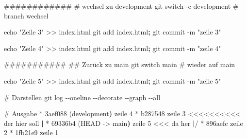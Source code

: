 \documentclass[
  ngerman,
  letterpaper,
  DIV=11]{scrreprt}
\newenvironment{Shaded}{\begin{snugshade}}{\end{snugshade}}
\newcommand{\AttributeTok}[1]{\textcolor[rgb]{0.40,0.45,0.13}{#1}}
\newcommand{\BuiltInTok}[1]{\textcolor[rgb]{0.00,0.23,0.31}{#1}}
\newcommand{\CommentTok}[1]{\textcolor[rgb]{0.37,0.37,0.37}{#1}}
\newcommand{\ErrorTok}[1]{\textcolor[rgb]{0.68,0.00,0.00}{#1}}
\newcommand{\ExtensionTok}[1]{\textcolor[rgb]{0.00,0.23,0.31}{#1}}
\newcommand{\FunctionTok}[1]{\textcolor[rgb]{0.28,0.35,0.67}{#1}}
\newcommand{\KeywordTok}[1]{\textcolor[rgb]{0.00,0.23,0.31}{\textbf{#1}}}
\newcommand{\NormalTok}[1]{\textcolor[rgb]{0.00,0.23,0.31}{#1}}
\newcommand{\OperatorTok}[1]{\textcolor[rgb]{0.37,0.37,0.37}{#1}}
\newcommand{\StringTok}[1]{\textcolor[rgb]{0.13,0.47,0.30}{#1}}
\begin{document}
\begin{Shaded}
\begin{Highlighting}[]
\CommentTok{\#\#\#\#\#\#\#\#\#\#\#\#}
\CommentTok{\# wechsel zu development}
\FunctionTok{git}\NormalTok{ switch }\AttributeTok{{-}c}\NormalTok{ development  }\CommentTok{\# branch wechsel}

\BuiltInTok{echo} \StringTok{"Zeile 3"} \OperatorTok{\textgreater{}\textgreater{}}\NormalTok{ index.html}
\FunctionTok{git}\NormalTok{ add index.html}\KeywordTok{;} \FunctionTok{git}\NormalTok{ commit }\AttributeTok{{-}m} \StringTok{"zeile 3"}

\BuiltInTok{echo} \StringTok{"Zeile 4"} \OperatorTok{\textgreater{}\textgreater{}}\NormalTok{ index.html}
\FunctionTok{git}\NormalTok{ add index.html}\KeywordTok{;} \FunctionTok{git}\NormalTok{ commit }\AttributeTok{{-}m} \StringTok{"zeile 4"}

\CommentTok{\#\#\#\#\#\#\#\#\#\#\#}
\CommentTok{\#\# Zurück zu main}
\FunctionTok{git}\NormalTok{ switch main  }\CommentTok{\# wieder auf main}

\BuiltInTok{echo} \StringTok{"Zeile 5"} \OperatorTok{\textgreater{}\textgreater{}}\NormalTok{ index.html}
\FunctionTok{git}\NormalTok{ add index.html}\KeywordTok{;} \FunctionTok{git}\NormalTok{ commit }\AttributeTok{{-}m} \StringTok{"zeile 5"}


\CommentTok{\# Darstellen}
\FunctionTok{git}\NormalTok{ log }\AttributeTok{{-}{-}oneline} \AttributeTok{{-}{-}decorate} \AttributeTok{{-}{-}graph} \AttributeTok{{-}{-}all}
\end{Highlighting}
\end{Shaded}

\begin{Shaded}
\begin{Highlighting}[]
\CommentTok{\# Ausgabe }
\ExtensionTok{*}\NormalTok{ 3aef088 }\ErrorTok{(}\ExtensionTok{development}\KeywordTok{)} \ExtensionTok{zeile}\NormalTok{ 4}
\ExtensionTok{*}\NormalTok{ b287548 zeile 3      }\OperatorTok{\textless{}\textless{}\textless{}\textless{}\textless{}\textless{}\textless{}\textless{}\textless{}\textless{}}\NormalTok{ der hier soll}
\KeywordTok{|} \ExtensionTok{*}\NormalTok{ 69336b4 }\ErrorTok{(}\ExtensionTok{HEAD} \AttributeTok{{-}}\OperatorTok{\textgreater{}}\NormalTok{ main}\KeywordTok{)} \ExtensionTok{zeile}\NormalTok{ 5   }\OperatorTok{\textless{}\textless{}\textless{}}\NormalTok{ da her}
\KeywordTok{|}\ExtensionTok{/}  
\ExtensionTok{*}\NormalTok{ 896aefc zeile 2}
\ExtensionTok{*}\NormalTok{ 1fb21e9 zeile 1}
\end{Highlighting}
\end{Shaded}
\end{document}
